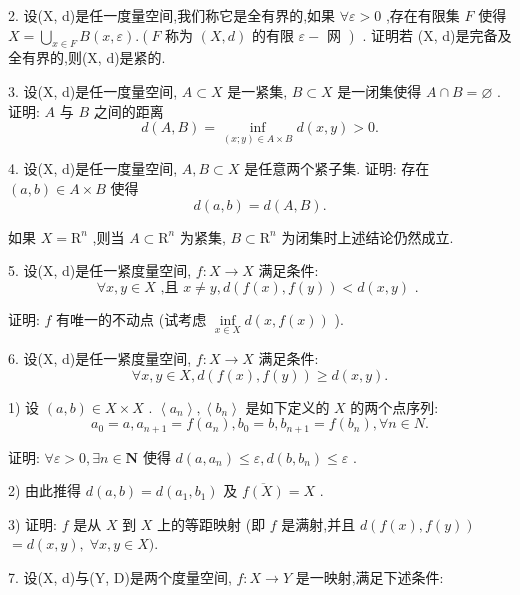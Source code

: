 2. 设(X, d)是任一度量空间,我们称它是全有界的,如果 $\forall \varepsilon  > 0$ ,存在有限集 $F$ 使得 $X = \mathop{\bigcup }\limits_{{x \in  F}}B\left( {x,\varepsilon }\right) .\left( {F\text{ 称为 }\left( {X,d}\right) \text{ 的有限 }\varepsilon  - \text{ 网 }}\right)$ . 证明若 (X, d)是完备及全有界的,则(X, d)是紧的.

3. 设(X, d)是任一度量空间, $A \subset  X$ 是一紧集, $B \subset  X$ 是一闭集使得 $A \cap  B = \varnothing$ . 证明: $A$ 与 $B$ 之间的距离
$$d\left( {A,B}\right)  = \mathop{\inf }\limits_{{\left( {x;y}\right)  \in  A \times  B}}d\left( {x,y}\right)  > 0.$$

4. 设(X, d)是任一度量空间, $A,B \subset  X$ 是任意两个紧子集. 证明: 存在 $\left( {a,b}\right)  \in  A \times  B$ 使得
$$d\left( {a,b}\right)  = d\left( {A,B}\right) .$$

如果 $X = {\mathrm{R}}^{n}$ ,则当 $A \subset  {\mathrm{R}}^{n}$ 为紧集, $B \subset  {\mathrm{R}}^{n}$ 为闭集时上述结论仍然成立.

5. 设(X, d)是任一紧度量空间, $f : X \rightarrow  X$ 满足条件:
$$\forall x,y \in  X\text{ ,且 }x \neq  y,d\left( {f\left( x\right) ,f\left( y\right) }\right)  < d\left( {x,y}\right) \text{ . }$$

证明: $f$ 有唯一的不动点 (试考虑 $\mathop{\inf }\limits_{{x \in  X}}d\left( {x,f\left( x\right) }\right)$ ).

6. 设(X, d)是任一紧度量空间, $f : X \rightarrow  X$ 满足条件:
$$\forall x,y \in  X,d\left( {f\left( x\right) ,f\left( y\right) }\right)  \geq  d\left( {x,y}\right) .$$

1) 设 $\left( {a,b}\right)  \in  X \times  X$ . $\left\langle  {a}_{n}\right\rangle  ,\left\langle  {b}_{n}\right\rangle$ 是如下定义的 $X$ 的两个点序列:
$${a}_{0} = a,{a}_{n + 1} = f\left( {a}_{n}\right) ,{b}_{0} = b,{b}_{n + 1} = f\left( {b}_{n}\right) ,\forall n \in  N.$$

证明: $\forall \varepsilon  > 0,\exists n \in  \mathbf{N}$ 使得 $d\left( {a,{a}_{n}}\right)  \leq  \varepsilon ,d\left( {b,{b}_{n}}\right)  \leq  \varepsilon$ .

2) 由此推得 $d\left( {a,b}\right)  = d\left( {{a}_{1},{b}_{1}}\right)$ 及 $\overline{f\left( X\right) } = X$ .

3) 证明: $f$ 是从 $X$ 到 $X$ 上的等距映射 (即 $f$ 是满射,并且 $d\left( {f\left( x\right) ,f\left( y\right) }\right)$  $= d\left( {x,y}\right) ,\;\forall x,y \in  X).$

7. 设(X, d)与(Y, D)是两个度量空间, $f : X \rightarrow  Y$ 是一映射,满足下述条件:

